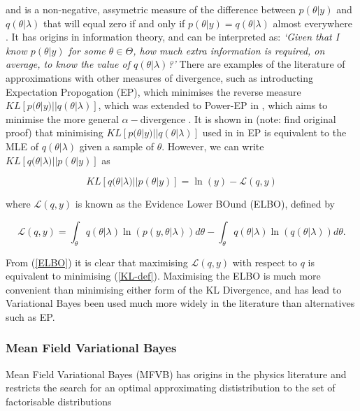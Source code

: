 \documentclass{article}\usepackage[]{graphicx}\usepackage[]{color}
\begin{document}
and is a non-negative, assymetric measure of the difference between $p(\theta | y)$ and $q(\theta | \lambda)$ that will equal zero if and only if $p(\theta | y) = q(\theta | \lambda)$ almost everywhere \citep{Bishop2006}. It has origins in information theory, and can be interpreted as: \textit{`Given that I know $p(\theta | y)$ for some $\theta \in \Theta$, how much extra information is required, on average, to know the value of $q(\theta | \lambda)$?'} There are examples of the literature of approximations with other measures of divergence, such as \citet{Minka2001} introducting Expectation Propogation (EP), which minimises the reverse measure $KL[p(\theta | y)||q(\theta |\lambda)]$, which was extended to Power-EP in \citet{Minka2004}, which aims to minimise the more general $\alpha-\mbox{divergence}$ \citep{Amari1985}. It is shown in \citet{Bishop2006} (note: find original proof) that minimising $KL[p(\theta | y)||q(\theta | \lambda)]$ used in in EP is equivalent to the MLE of $q(\theta | \lambda)$ given a sample of $\theta$. However, we can write $KL[q(\theta | \lambda)||p(\theta | y)]$ as

\begin{equation}
\label{KL-ELBO}
KL[q(\theta | \lambda)||p(\theta | y)] = \ln(y) - \mathcal{L}(q, y)
\end{equation}

where $\mathcal{L}(q, y)$ is known as the Evidence Lower BOund (ELBO), defined by

\begin{equation}
\label{ELBO}
\mathcal{L}(q, y) = \int_{\theta} q(\theta|\lambda) \ln (p(y, \theta|\lambda)) d\theta -  \int_{\theta} q(\theta|\lambda) \ln (q(\theta|\lambda)) d\theta.
\end{equation}

From (\ref{ELBO}) it is clear that maximising $\mathcal{L}(q, y)$ with respect to $q$ is equivalent to minimising (\ref{KL-def}). Maximising the ELBO is much more convenient than minimising either form of the KL Divergence, and has lead to Variational Bayes been used much more widely in the literature than alternatives such as EP.

\subsubsection{Mean Field Variational Bayes} 

Mean Field Variational Bayes (MFVB) has origins in the physics literature \citep{Chandler1987} and restricts the search for an optimal approximating dististribution to the set of factorisable distributions
\end{document}
